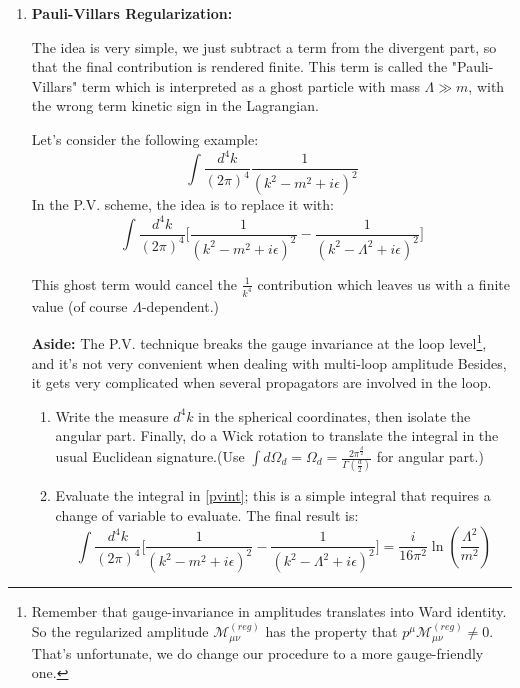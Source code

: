 \documentclass[11pt]{article}
\begin{document}
	\begin{enumerate}
		\item
		\begin{problem}{\points{-}}
			\textbf{Pauli-Villars Regularization:}
			
			\noindent
			The idea is very simple, we just subtract a term from the divergent part, so that the final contribution is rendered finite. This term is called the "Pauli-Villars" term which is interpreted as a ghost particle with mass $\Lambda \gg m$, with the wrong term kinetic sign in the Lagrangian.
			
			Let's consider the following example:
			\[
			\int \frac{d^4k}{(2\pi)^4}\frac{1}{(k^2-m^2+i\epsilon)^2}
			\]	
			In the P.V. scheme, the idea is to replace it with:
			\begin{equation}
				\int	\frac{d^4k}{(2\pi)^4}\Big[ \frac{1}{(k^2-m^2+i\epsilon)^2} - \frac{1}{(k^2-\Lambda^2+i\epsilon)^2}
				\Big]
				\label{pvint}
			\end{equation}
		
			
			This ghost term would cancel the $\frac{1}{k^4}$ contribution which leaves us with a finite value (of course $\Lambda$-dependent.)
			
			\textbf{Aside:} The P.V. technique breaks the gauge invariance at the loop level\footnote{Remember that gauge-invariance in amplitudes translates into Ward identity. So the regularized amplitude $\mathcal{M}_{\mu\nu}^{(reg)}$ has the property that $p^\mu\mathcal{M}_{\mu\nu}^{(reg)}\neq 0$. That's unfortunate, we do change our procedure to a more gauge-friendly one.}, and it's not very convenient when dealing with multi-loop amplitude Besides, it gets very complicated when several propagators are involved in the loop.
			\begin{enumerate}
				\item Write the measure $d^4k$ in the spherical coordinates, then isolate the angular part. Finally, do a Wick rotation to translate the integral in the usual Euclidean signature.(Use $\int d\Omega_d = \Omega_d = \frac{2\pi^{\frac{d}{2}}}{\Gamma(\frac{d}{2})}$ for angular part.)
				\item Evaluate the integral in \eqref{pvint}; this is a simple integral that requires a change of variable to evaluate. The final result is:
				\[
				\int	\frac{d^4k}{(2\pi)^4}\Big[ \frac{1}{(k^2-m^2+i\epsilon)^2} - \frac{1}{(k^2-\Lambda^2+i\epsilon)^2}
				\Big] =
				\frac{i}{16\pi^2}\ln(\frac{\Lambda^2}{m^2})
				\]
			\end{enumerate}
			

\end{problem}
\end{enumerate}
\end{document}
